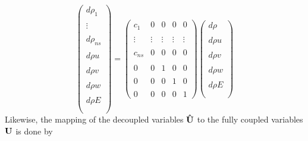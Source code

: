 \documentclass{article}   	%
\begin{document}
\begin{equation}
  \begin{pmatrix}
 		d \rho_1    \\ \\
		  \vdots    \\ \\
		d \rho_{ns} \\ \\
		d \rho u    \\ \\
		d \rho v    \\ \\
		d \rho w    \\ \\
		d \rho E    \\ \\
	\end{pmatrix} =
  \begin{pmatrix}
    c_1    & 0 & 0 & 0 & 0 \\ \\
    \vdots & \vdots & \vdots & \vdots & \vdots \\ \\
    c_{ns} & 0 & 0 & 0 & 0 \\ \\
    0      & 0 & 1 & 0 & 0 \\ \\
    0      & 0 & 0 & 1 & 0 \\ \\
    0      & 0 & 0 & 0 & 1
  \end{pmatrix}
  \begin{pmatrix}
 		d \rho    \\ \\
		d \rho u  \\ \\
		d \rho v  \\ \\
		d \rho w  \\ \\
		d \rho E  \\ \\
	\end{pmatrix}
  \label{q-map1}
\end{equation}
Likewise, the mapping of the decoupled variables $\mathbf{\hat{U}}$ to the
fully coupled variables $\mathbf U$ is done by
\end{document}
